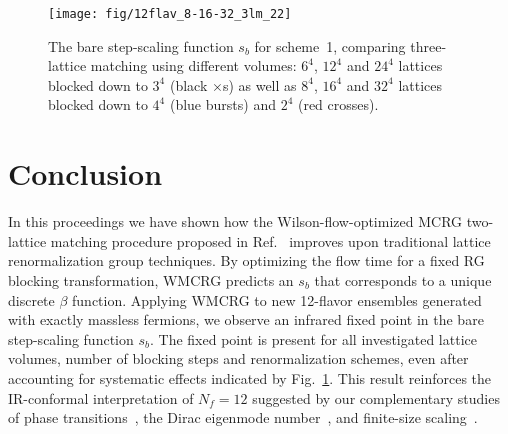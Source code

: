 \documentclass{PoS}
\newcommand{\be}{\ensuremath{\beta} }
\newcommand{\fig}[1]{Fig.~\ref{#1}}
\newcommand{\refcite}[1]{Ref.~\cite{#1}}
\begin{document}
\begin{figure}[th]
  \centering
  \texttt{[image: fig/12flav\_8-16-32\_3lm\_22]}
  \caption{The bare step-scaling function $s_b$ for scheme~1, comparing three-lattice matching using different volumes: $6^4$, $12^4$ and $24^4$ lattices blocked down to $3^4$ (black $\times$s) as well as $8^4$, $16^4$ and $32^4$ lattices blocked down to $4^4$ (blue bursts) and $2^4$ (red crosses).}
  \label{fig:scheme1}
\end{figure}



\section{Conclusion} %
In this proceedings we have shown how the Wilson-flow-optimized MCRG two-lattice matching procedure proposed in \refcite{Petropoulos:2012mg} improves upon traditional lattice renormalization group techniques.
By optimizing the flow time for a fixed RG blocking transformation, WMCRG predicts an $s_b$ that corresponds to a unique discrete \be function.
Applying WMCRG to new 12-flavor ensembles generated with exactly massless fermions, we observe an infrared fixed point in the bare step-scaling function $s_b$.
The fixed point is present for all investigated lattice volumes, number of blocking steps and renormalization schemes, even after accounting for systematic effects indicated by \fig{fig:scheme1}.
This result reinforces the IR-conformal interpretation of $N_f = 12$ suggested by our complementary studies of phase transitions~\cite{Schaich:2012fr, Hasenfratz:2013uha}, the Dirac eigenmode number~\cite{Cheng:2013eu, Cheng:2013bca}, and finite-size scaling~\cite{Hasenfratz:2013eka}.



\end{document}
